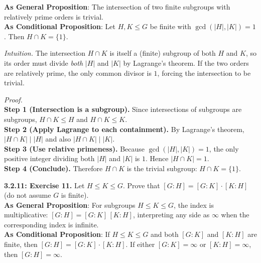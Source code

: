\documentclass[12pt]{article}
\theoremstyle{definition}
\begin{document}
\noindent\textbf{As General Proposition}: The intersection of two finite subgroups with relatively prime orders is trivial.\\

\noindent \textbf{As Conditional Proposition}: Let $H,K\le G$ be finite with $\gcd(|H|,|K|)=1$. Then $H\cap K=\{1\}$.\\

\newpage

\dotfill

\emph{Intuition.} The intersection $H\cap K$ is itself a (finite) subgroup of both $H$ and $K$, so its order must divide \emph{both} $|H|$ and $|K|$ by Lagrange’s theorem. If the two orders are relatively prime, the only common divisor is $1$, forcing the intersection to be trivial.\\

\dotfill

\emph{Proof.}\\
\textbf{Step 1 (Intersection is a subgroup).} Since intersections of subgroups are subgroups, $H\cap K\le H$ and $H\cap K\le K$.\\
\textbf{Step 2 (Apply Lagrange to each containment).} By Lagrange’s theorem, $|H\cap K|\mid |H|$ and also $|H\cap K|\mid |K|$.\\
\textbf{Step 3 (Use relative primeness).} Because $\gcd(|H|,|K|)=1$, the only positive integer dividing both $|H|$ and $|K|$ is $1$. Hence $|H\cap K|=1$.\\
\textbf{Step 4 (Conclude).} Therefore $H\cap K$ is the trivial subgroup: $H\cap K=\{1\}$.\\

\newpage

\newpage

\noindent \textbf{3.2.11: Exercise 11.} Let $H \le K \le G$. Prove that $[G:H]=[G:K]\cdot[K:H]$ (do not assume $G$ is finite).\\ %

\noindent\textbf{As General Proposition}: For subgroups $H\le K\le G$, the index is multiplicative: $[G:H]=[G:K]\,[K:H]$, interpreting any side as $\infty$ when the corresponding index is infinite.\\

\noindent \textbf{As Conditional Proposition}: If $H\le K\le G$ and both $[G:K]$ and $[K:H]$ are finite, then $[G:H]=[G:K]\cdot[K:H]$. If either $[G:K]=\infty$ or $[K:H]=\infty$, then $[G:H]=\infty$.\\

\newpage
\end{document}
